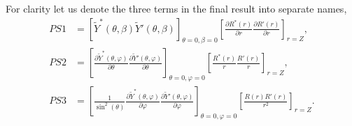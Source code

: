 \documentclass[british,english]{article}
\numberwithin{equation}{section}
\numberwithin{figure}{section}
\begin{document}
For clarity let us denote the three terms in the final result into separate names,
\begin{align}
PS1&=\left[\tilde{Y}^*(\theta,\beta)\tilde{Y}'(\theta,\beta)\right]_{\theta=0,\beta=0}\left[\frac{\partial R^*(r)}{\partial r}\frac{\partial R'(r)}{\partial r}\right]_{r=Z},\\
PS2&=\left[\frac{\partial \tilde{Y}^*(\theta,\varphi)}{\partial \theta}\frac{\partial \tilde{Y}'(\theta,\varphi)}{\partial \theta}\right]_{\theta=0,\varphi=0}\left[\frac{R^*(r)}{r}\frac{R'(r)}{r}\right]_{r=Z},\\
PS3&=\left[\frac{1}{\sin^2(\theta)}\frac{\partial \tilde{Y}^*(\theta,\varphi)}{\partial \varphi}\frac{\partial \tilde{Y}'(\theta,\varphi)}{\partial \varphi}\right]_{\theta=0,\varphi=0}\left[\frac{R(r)R'(r)}{r^2}\right]_{r=Z}.
\end{align}

\end{document}
